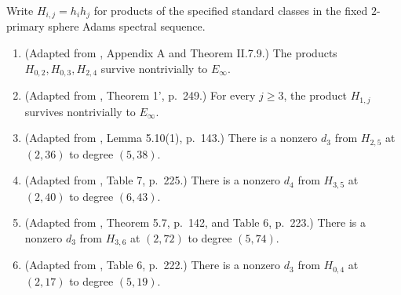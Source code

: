 \begin{theorem}
\label{frontier:Literature:83726561f77b}
Write $H_{i,j}=h_i h_j$ for products of the specified standard classes in the
fixed $2$-primary sphere Adams spectral sequence.
\begin{enumerate}
\item (Adapted from \cite{MayThesis1964}, Appendix A and Theorem II.7.9.)
The products $H_{0,2},H_{0,3},H_{2,4}$ survive nontrivially to $E_\infty$.
\item (Adapted from \cite{Mahowaldetaj}, Theorem 1', p.~249.)
For every $j\geq3$, the product $H_{1,j}$ survives nontrivially to $E_\infty$.
\item (Adapted from \cite{IWX}, Lemma 5.10(1), p.~143.)
There is a nonzero $d_3$ from $H_{2,5}$ at $(2,36)$ to degree $(5,38)$.
\item (Adapted from \cite{IWX}, Table 7, p.~225.)
There is a nonzero $d_4$ from $H_{3,5}$ at $(2,40)$ to degree $(6,43)$.
\item (Adapted from \cite{IWX}, Theorem 5.7, p.~142, and Table 6, p.~223.)
There is a nonzero $d_3$ from $H_{3,6}$ at $(2,72)$ to degree $(5,74)$.
\item (Adapted from \cite{IWX}, Table 6, p.~222.)
There is a nonzero $d_3$ from $H_{0,4}$ at $(2,17)$ to degree $(5,19)$.
\end{enumerate}
\end{theorem}
